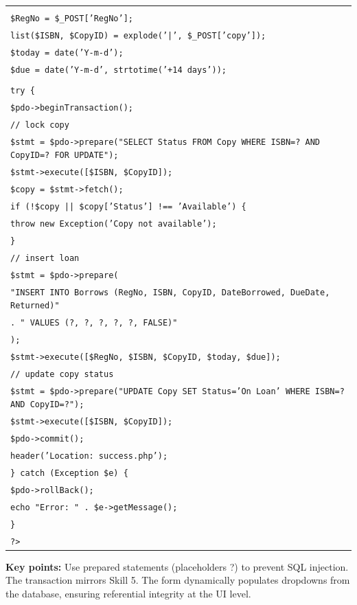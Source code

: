 \documentclass[11pt]{article}
\begin{document}
\begin{exoresolu}
\begin{enumerate}
\begin{center}
\begin{tabular}{|l|}
\texttt{} \\
\texttt{\$RegNo = \$\_POST['RegNo'];} \\
\texttt{list(\$ISBN, \$CopyID) = explode('|', \$\_POST['copy']);} \\
\texttt{\$today = date('Y-m-d');} \\
\texttt{\$due = date('Y-m-d', strtotime('+14 days'));} \\
\texttt{} \\
\texttt{try \{} \\
\texttt{\quad \$pdo->beginTransaction();} \\
\texttt{\quad // lock copy} \\
\texttt{\quad \$stmt = \$pdo->prepare("SELECT Status FROM Copy WHERE ISBN=? AND CopyID=? FOR UPDATE");} \\
\texttt{\quad \$stmt->execute([\$ISBN, \$CopyID]);} \\
\texttt{\quad \$copy = \$stmt->fetch();} \\
\texttt{\quad if (!\$copy || \$copy['Status'] !== 'Available') \{} \\
\texttt{\quad\quad throw new Exception('Copy not available');} \\
\texttt{\quad \}} \\
\texttt{\quad // insert loan} \\
\texttt{\quad \$stmt = \$pdo->prepare(} \\
\texttt{\quad\quad "INSERT INTO Borrows (RegNo, ISBN, CopyID, DateBorrowed, DueDate, Returned)"} \\
\texttt{\quad\quad . " VALUES (?, ?, ?, ?, ?, FALSE)"} \\
\texttt{\quad);} \\
\texttt{\quad \$stmt->execute([\$RegNo, \$ISBN, \$CopyID, \$today, \$due]);} \\
\texttt{\quad // update copy status} \\
\texttt{\quad \$stmt = \$pdo->prepare("UPDATE Copy SET Status='On Loan' WHERE ISBN=? AND CopyID=?");} \\
\texttt{\quad \$stmt->execute([\$ISBN, \$CopyID]);} \\
\texttt{\quad \$pdo->commit();} \\
\texttt{\quad header('Location: success.php');} \\
\texttt{\} catch (Exception \$e) \{} \\
\texttt{\quad \$pdo->rollBack();} \\
\texttt{\quad echo "Error: " . \$e->getMessage();} \\
\texttt{\}} \\
\texttt{?>} \\
\hline
\end{tabular}
\end{center}
\textbf{Key points:} Use prepared statements (placeholders ?) to prevent SQL injection. The transaction mirrors Skill 5. The form dynamically populates dropdowns from the database, ensuring referential integrity at the UI level.
\end{enumerate}
\end{exoresolu}
\end{document}
